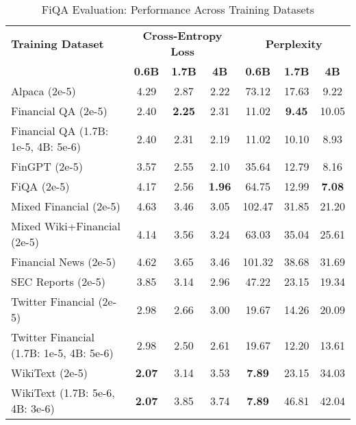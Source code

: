 
\begin{table}[h]
\centering
\caption[FiQA Evaluation: Cross-Dataset Performance]{FiQA Evaluation: Performance Across Training Datasets}
\label{tab:cross_fiqa}
\begin{tabular}{l|ccc|ccc}
\hline
\textbf{Training Dataset} & \multicolumn{3}{c|}{\textbf{Cross-Entropy Loss}} & \multicolumn{3}{c}{\textbf{Perplexity}} \\
\cline{2-4} \cline{5-7}
  & \textbf{0.6B} & \textbf{1.7B} & \textbf{4B} & \textbf{0.6B} & \textbf{1.7B} & \textbf{4B} \\
Alpaca (2e-5) & 4.29 & 2.87 & 2.22 & 73.12 & 17.63 & 9.22  \\
Financial QA (2e-5) & 2.40 & \textbf{2.25} & 2.31 & 11.02 & \textbf{9.45} & 10.05  \\
Financial QA (1.7B: 1e-5, 4B: 5e-6) & 2.40 & 2.31 & 2.19 & 11.02 & 10.10 & 8.93  \\
FinGPT (2e-5) & 3.57 & 2.55 & 2.10 & 35.64 & 12.79 & 8.16  \\
FiQA (2e-5) & 4.17 & 2.56 & \textbf{1.96} & 64.75 & 12.99 & \textbf{7.08}  \\
Mixed Financial (2e-5) & 4.63 & 3.46 & 3.05 & 102.47 & 31.85 & 21.20  \\
Mixed Wiki+Financial (2e-5) & 4.14 & 3.56 & 3.24 & 63.03 & 35.04 & 25.61  \\
Financial News (2e-5) & 4.62 & 3.65 & 3.46 & 101.32 & 38.68 & 31.69  \\
SEC Reports (2e-5) & 3.85 & 3.14 & 2.96 & 47.22 & 23.15 & 19.34  \\
Twitter Financial (2e-5) & 2.98 & 2.66 & 3.00 & 19.67 & 14.26 & 20.09  \\
Twitter Financial (1.7B: 1e-5, 4B: 5e-6) & 2.98 & 2.50 & 2.61 & 19.67 & 12.20 & 13.61  \\
WikiText (2e-5) & \textbf{2.07} & 3.14 & 3.53 & \textbf{7.89} & 23.15 & 34.03  \\
WikiText (1.7B: 5e-6, 4B: 3e-6) & \textbf{2.07} & 3.85 & 3.74 & \textbf{7.89} & 46.81 & 42.04  \\
\hline
\end{tabular}
\end{table}

